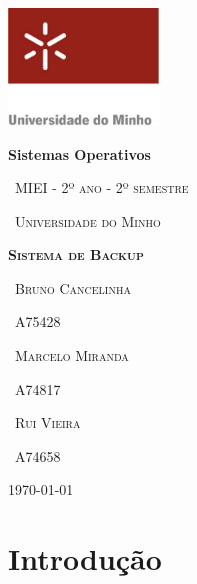 \documentclass[12pt,a4paper]{report}
\begin{document}
\begin{titlepage}
	\centering
	\includegraphics[width=0.3\textwidth]{uminho.jpg}\par\vspace{1cm}
	{\huge\bfseries Sistemas Operativos \par}
	\vspace{0.5cm}
	{\scshape\ MIEI - 2º ano - 2º semestre\par}
	\vspace{0.1cm}
	{\scshape\ Universidade do Minho\par}
	\vspace{1.5cm}
    {\scshape\Huge\bfseries Sistema de Backup \par}
	\vspace{5cm}
    \vspace{1cm}
	{\scshape\ Bruno Cancelinha \par} 	\vspace{0.1cm}
	{\scshape\ A75428 \par}  \vspace{0.3cm}
	{\scshape\ Marcelo Miranda \par} \vspace{0.1cm}
	{\scshape\ A74817 \par}  \vspace{0.3cm}
	{\scshape\ Rui Vieira \par} \vspace{0.1cm}
	{\scshape\ A74658 \par}  \vspace{0.3cm}

	\vfill
	{\large \today\par}
\end{titlepage}

\tableofcontents

\chapter{Introdução}
\end{document}
